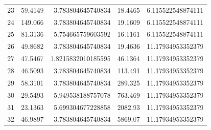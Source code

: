 \begin{tabular}{rrrrr}
23 & 59.4149 & 3.783804645740834 & 18.4465 & 6.115522548874111\\
24 & 149.066 & 3.783804645740834 & 19.1609 & 6.115522548874111\\
25 & 81.3136 & 5.754665759603592 & 16.1161 & 6.115522548874111\\
26 & 49.8682 & 3.783804645740834 & 19.4636 & 11.17934953352379\\
27 & 47.5467 & 1.8215832010185595 & 46.1364 & 11.17934953352379\\
28 & 46.5093 & 3.783804645740834 & 113.491 & 11.17934953352379\\
29 & 58.3101 & 3.783804645740834 & 289.325 & 11.17934953352379\\
30 & 29.5493 & 5.949538188757078 & 763.469 & 11.17934953352379\\
31 & 23.1363 & 5.699304677228858 & 2082.93 & 11.17934953352379\\
32 & 46.9897 & 3.783804645740834 & 5869.07 & 11.17934953352379\\
\bottomrule
\end{tabular}
